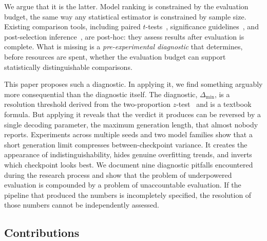 \documentclass[pdflatex,sn-mathphys-ay,oneside]{sn-jnl}
\theoremstyle{thmstylethree}
\begin{document}
We argue that it is the latter. Model ranking is constrained by the evaluation budget, the same way any statistical estimator is constrained by sample size. Existing comparison tools, including paired $t$-tests~\citep{dietterich1998approximate}, significance guidelines~\citep{dror2018hitchhiker}, and post-selection inference~\citep{zrnic2024flexible,zhang2024winners}, are post-hoc: they assess results after evaluation is complete. What is missing is a \emph{pre-experimental diagnostic} that determines, before resources are spent, whether the evaluation budget can support statistically distinguishable comparisons.

This paper proposes such a diagnostic. In applying it, we find something arguably more consequential than the diagnostic itself. The diagnostic, $\Delta_{\min}$, is a resolution threshold derived from the two-proportion $z$-test~\citep{cohen1988statistical} and is a textbook formula. But applying it reveals that the verdict it produces can be reversed by a single decoding parameter, the maximum generation length, that almost nobody reports. Experiments across multiple seeds and two model families show that a short generation limit compresses between-checkpoint variance. It creates the appearance of indistinguishability, hides genuine overfitting trends, and inverts which checkpoint looks best. We document nine diagnostic pitfalls encountered during the research process and show that the problem of underpowered evaluation is compounded by a problem of unaccountable evaluation. If the pipeline that produced the numbers is incompletely specified, the resolution of those numbers cannot be independently assessed.

\subsection*{Contributions}
\end{document}
